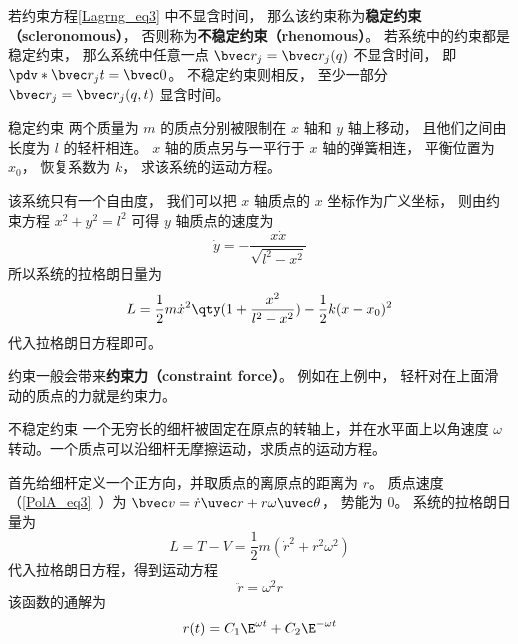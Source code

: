 若约束方程\autoref{Lagrng_eq3} 中不显含时间， 那么该约束称为\textbf{稳定约束（scleronomous）}， 否则称为\textbf{不稳定约束（rhenomous）}。 若系统中的约束都是稳定约束， 那么系统中任意一点 $\bvec r_j = \bvec r_j(q)$ 不显含时间， 即 $\pdv*{\bvec r_j}{t} = \bvec 0$。 不稳定约束则相反， 至少一部分 $\bvec r_j = \bvec r_j(q, t)$ 显含时间。

\begin{example}{稳定约束}
两个质量为 $m$ 的质点分别被限制在 $x$ 轴和 $y$ 轴上移动， 且他们之间由长度为 $l$ 的轻杆相连。 $x$ 轴的质点另与一平行于 $x$ 轴的弹簧相连， 平衡位置为 $x_0$， 恢复系数为 $k$， 求该系统的运动方程。%

该系统只有一个自由度， 我们可以把 $x$ 轴质点的 $x$ 坐标作为广义坐标， 则由约束方程 $x^2 + y^2 = l^2$ 可得 $y$ 轴质点的速度为
\begin{equation}
\dot y = -\frac{x\dot x}{\sqrt{l^2 - x^2}}
\end{equation}
所以系统的拉格朗日量为
\begin{equation}
L = \frac12 m \dot x^2\qty(1 + \frac{x^2}{l^2 - x^2}) - \frac12 k (x-x_0)^2
\end{equation}
代入拉格朗日方程即可。
\end{example}
约束一般会带来\textbf{约束力（constraint force）}。 例如在上例中， 轻杆对在上面滑动的质点的力就是约束力。

\begin{example}{不稳定约束}\label{Lagrng_ex3}
一个无穷长的细杆被固定在原点的转轴上，并在水平面上以角速度 $\omega$ 转动。一个质点可以沿细杆无摩擦运动，求质点的运动方程。

首先给细杆定义一个正方向，并取质点的离原点的距离为 $r$。 质点速度（\autoref{PolA_eq3}~）为 $\bvec v = \dot r \uvec r + r\omega \uvec\theta$， 势能为 0。 系统的拉格朗日量为
\begin{equation}
L = T - V = \frac12 m(\dot r^2 + r^2 \omega^2)
\end{equation}
代入拉格朗日方程，得到运动方程
\begin{equation}
\ddot r = \omega^2 r
\end{equation}
该函数的通解为%
\begin{equation}
r(t) = C_1 \E^{\omega t} + C_2 \E^{-\omega t}
\end{equation}
\end{example}

